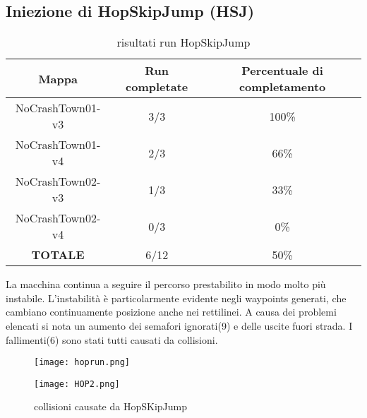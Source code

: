 \subsection{Iniezione di HopSkipJump (HSJ)}
\begin{table}[h]
    \begin{tabular}{|c|c|c|}
        \hline
        Mappa                   & Run completate & Percentuale di completamento\\
        \hline
        NoCrashTown01-v3        & 3/3            & 100\% \\
        NoCrashTown01-v4        & 2/3            & 66\% \\
        NoCrashTown02-v3        & 1/3            & 33\% \\
        NoCrashTown02-v4        & 0/3            & 0\%  \\
        \hline
        \textbf{TOTALE}                  & 6/12           & 50\% \\
        \hline
    \end{tabular}
    \caption{risultati run HopSkipJump}
    \label{tab:hsj}
\end{table}
La macchina continua a seguire il percorso prestabilito in modo molto più instabile. L'instabilità è particolarmente evidente negli waypoints generati, che cambiano continuamente posizione anche nei rettilinei. A causa dei problemi elencati
si nota un aumento dei semafori ignorati(9) e delle uscite fuori strada. I fallimenti(6) sono stati tutti causati da collisioni.
\begin{figure}[h]
    \centering
    \parbox{6cm}{
    \texttt{[image: hoprun.png]}
    \label{fig:hop1}}
    \qquad
    \begin{minipage}{6cm}
    \texttt{[image: HOP2.png]}
    \label{fig:hop2}
    \end{minipage}
    \label{fig:hoprun}
    \caption{collisioni causate da HopSKipJump}
    \label{fig:hop}
    \end{figure}
